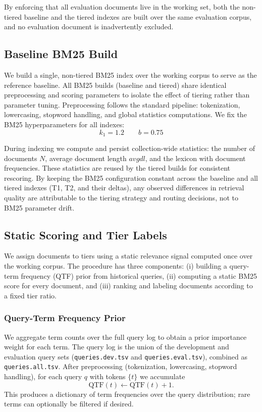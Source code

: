 \documentclass[11pt]{article}
\begin{document}
By enforcing that all evaluation documents live in the working set, both the non-tiered baseline and the tiered indexes are built over the same evaluation corpus, and no evaluation document is inadvertently excluded. \\

\subsection{Baseline BM25 Build}
We build a single, non-tiered BM25 index over the working corpus to serve as the reference baseline. All BM25 builds (baseline and tiered) share identical preprocessing and scoring parameters to isolate the effect of tiering rather than parameter tuning. Preprocessing follows the standard pipeline: tokenization, lowercasing, stopword handling, and global statistics computations. We fix the BM25 hyperparameters for all indexes:
\[
k_1 = 1.2 \qquad b = 0.75
\]

During indexing we compute and persist collection-wide statistics: the number of documents $N$, average document length $\mathit{avgdl}$, and the lexicon with document frequencies. These statistics are reused by the tiered builds for consistent rescoring. By keeping the BM25 configuration constant across the baseline and all tiered indexes (T1, T2, and their deltas), any observed differences in retrieval quality are attributable to the tiering strategy and routing decisions, not to BM25 parameter drift.

\subsection{Static Scoring and Tier Labels}
We assign documents to tiers using a static relevance signal computed once over the working corpus. The procedure has three components: (i) building a query-term frequency (QTF) prior from historical queries, (ii) computing a static BM25 score for every document, and (iii) ranking and labeling documents according to a fixed tier ratio.

\subsubsection{Query-Term Frequency Prior}
We aggregate term counts over the full query log to obtain a prior importance weight for each term. The query log is the union of the development and evaluation query sets (\texttt{queries.dev.tsv} and \texttt{queries.eval.tsv}), combined as \texttt{queries.all.tsv}. After preprocessing (tokenization, lowercasing, stopword handling), for each query $q$ with tokens $\{t\}$ we accumulate
\[
\text{QTF}(t) \leftarrow \text{QTF}(t) + 1.
\]
This produces a dictionary of term frequencies over the query distribution; rare terms can optionally be filtered if desired.
\end{document}
